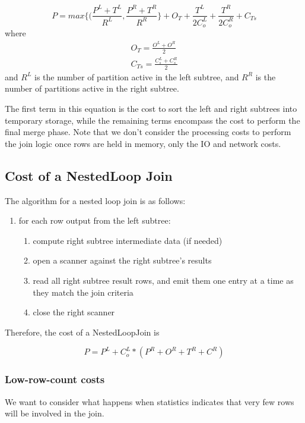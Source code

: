 \documentclass[10pt]{amsart}
\begin{document}
\begin{equation}
				P = max\lbrace(\frac{P^L+T^L}{R^L},\frac{P^R+T^R}{R^R}\rbrace + O_T+\frac{T^L}{2C_o^L}+\frac{T^R}{2C_o^R}+C_{Ts}
\end{equation}
where
\begin{equation*}
				\begin{aligned}
				O_T = \frac{O^L+O^R}{2} \\
				C_{Ts} = \frac{C_s^L+C_s^R}{2}
				\end{aligned}
\end{equation*}
and $R^L$ is the number of partition active in the left subtree, and $R^R$ is the number of partitions active in the right subtree.

The first term in this equation is the cost to sort the left and right subtrees into temporary storage, while the remaining terms encompass the cost to perform the final merge phase. Note that we don't consider the processing costs to perform the join logic once rows are held in memory, only the IO and network costs.

\subsection{Cost of a NestedLoop Join}
The algorithm for a nested loop join is as follows:

\begin{enumerate}
				\item for each row output from the left subtree:
								\begin{enumerate}
												\item compute right subtree intermediate data (if needed)
												\item open a scanner against the right subtree's results
												\item read all right subtree result rows, and emit them one entry at a time as they match the join criteria
												\item close the right scanner
								\end{enumerate}
\end{enumerate}
Therefore, the cost of a NestedLoopJoin is

\begin{equation}
				P = P^L + C_o^L*(P^R + O^R + T^R + C^R)
\end{equation}

\subsubsection{Low-row-count costs}
We want to consider what happens when statistics indicates that very few rows will be involved in the join. 
\end{document}
